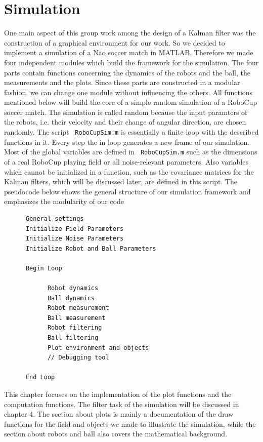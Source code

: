 
\chapter{Simulation}

One main aspect of this group work among the design of a Kalman filter was the construction of a graphical environment for our work. So we decided to implement a simulation of a Nao soccer match in MATLAB. Therefore we made four independent modules which build the framework for the simulation. The four parts contain functions concerning the dynamics of the robots and the ball, the measurements and the plots. Since these parts are constructed in a modular fashion, we can change one module without influencing the others. All functions mentioned below will build the core of a simple random simulation of a RoboCup soccer match. The simulation is called random because the input paramters of the robots, i.e. their velocity and their change of angular direction, are chosen randomly. The script \texttt{ RoboCupSim.m} is essentially a finite loop with the described functions in it. Every step the in loop generates a new frame of our simulation. Most of the global variables are defined in \texttt{ RoboCupSim.m} such as the dimensions of a real RoboCup playing field or all noise-relevant parameters. Also variables which cannot be initialized in a function, such as the covariance matrices for the Kalman filters, which will be discussed later, are defined in this script. The pseudocode below shows the general structure of our simulation framework and emphasizes the modularity of our code

\begin{verbatim}
      General settings
      Initialize Field Parameters
      Initialize Noise Parameters
      Initialize Robot and Ball Parameters

      Begin Loop
	
            Robot dynamics
            Ball dynamics
            Robot measurement
            Ball measurement
            Robot filtering
            Ball filtering
            Plot environment and objects
            // Debugging tool
	
      End Loop
\end{verbatim}

This chapter focuses on the implementation of the plot functions and the computation functions. The filter task of the simulation will be discussed in chapter 4.
The section about plots is mainly a documentation of the draw functions for the field and objects we made to illustrate the simulation, while the section about robots and ball also covers the mathematical background.

